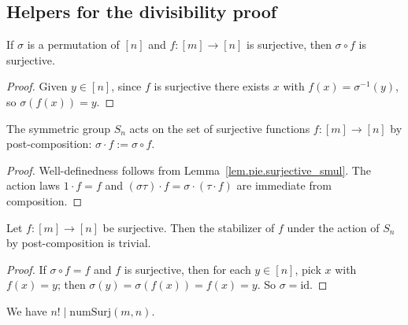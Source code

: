 \subsection{Helpers for the divisibility proof}

\begin{lemma}
\label{lem.pie.surjective_smul}
\leanhelper
\leanok
If $\sigma$ is a permutation of $[n]$ and
$f\colon [m] \to [n]$ is surjective, then
$\sigma \circ f$ is surjective.
\end{lemma}

\begin{proof}
Given $y \in [n]$, since $f$ is surjective there exists $x$ with
$f(x) = \sigma^{-1}(y)$, so $\sigma(f(x)) = y$.
\end{proof}

\begin{lemma}
\label{lem.pie.permActionOnSurj}
\leanhelper
\leanok
The symmetric group $S_n$ acts on the set of surjective
functions $f\colon [m] \to [n]$ by post-composition:
$\sigma \cdot f := \sigma \circ f$.
\end{lemma}

\begin{proof}
\leanok
Well-definedness follows from Lemma~\ref{lem.pie.surjective_smul}. The action
laws $1 \cdot f = f$ and $(\sigma\tau) \cdot f = \sigma \cdot (\tau \cdot f)$ are
immediate from composition.
\end{proof}

\begin{lemma}
\label{lem.pie.stabilizer_surj_eq_bot}
\leanhelper
\leanok
Let $f\colon [m] \to [n]$ be surjective. Then the
stabilizer of $f$ under the action of $S_n$ by
post-composition is trivial.
\end{lemma}

\begin{proof}
If $\sigma \circ f = f$ and $f$ is surjective, then for each $y \in [n]$,
pick $x$ with $f(x) = y$; then $\sigma(y) = \sigma(f(x)) = f(x) = y$. So $\sigma = \mathrm{id}$.
\end{proof}

\begin{lemma}
\label{lem.pie.factorial_dvd_numSurj}
\leanhelper
\leanok
We have $n! \mid \mathrm{numSurj}(m, n)$.
\end{lemma}

